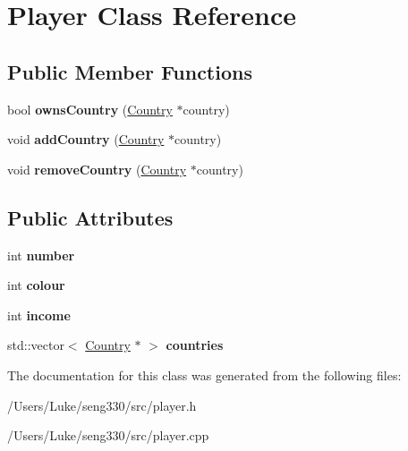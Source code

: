 \hypertarget{class_player}{}\section{Player Class Reference}
\label{class_player}
\subsection*{Public Member Functions}
\begin{DoxyCompactItemize}
\item 
\hypertarget{class_player_afb5d7b209f1a554deb921d60433130a0}{}bool {\bfseries owns\+Country} (\hyperlink{class_country}{Country} $\ast$country)\label{class_player_afb5d7b209f1a554deb921d60433130a0}

\item 
\hypertarget{class_player_af5fb0c8aff4eb80c072e958707b1f6d6}{}void {\bfseries add\+Country} (\hyperlink{class_country}{Country} $\ast$country)\label{class_player_af5fb0c8aff4eb80c072e958707b1f6d6}

\item 
\hypertarget{class_player_a6da51346f6a07b872e2c35faca141191}{}void {\bfseries remove\+Country} (\hyperlink{class_country}{Country} $\ast$country)\label{class_player_a6da51346f6a07b872e2c35faca141191}

\end{DoxyCompactItemize}
\subsection*{Public Attributes}
\begin{DoxyCompactItemize}
\item 
\hypertarget{class_player_af14f0d6ce7546bc1ded859df40cd8819}{}int {\bfseries number}\label{class_player_af14f0d6ce7546bc1ded859df40cd8819}

\item 
\hypertarget{class_player_ab5d1eafeb6c33bbe5bfc3205a3adf36d}{}int {\bfseries colour}\label{class_player_ab5d1eafeb6c33bbe5bfc3205a3adf36d}

\item 
\hypertarget{class_player_add605b5c083c3391c3d1abf000471731}{}int {\bfseries income}\label{class_player_add605b5c083c3391c3d1abf000471731}

\item 
\hypertarget{class_player_abc6528de5a3f2cb217723a553492b4c2}{}std\+::vector$<$ \hyperlink{class_country}{Country} $\ast$ $>$ {\bfseries countries}\label{class_player_abc6528de5a3f2cb217723a553492b4c2}

\end{DoxyCompactItemize}


The documentation for this class was generated from the following files\+:\begin{DoxyCompactItemize}
\item 
/\+Users/\+Luke/seng330/src/player.\+h\item 
/\+Users/\+Luke/seng330/src/player.\+cpp\end{DoxyCompactItemize}
